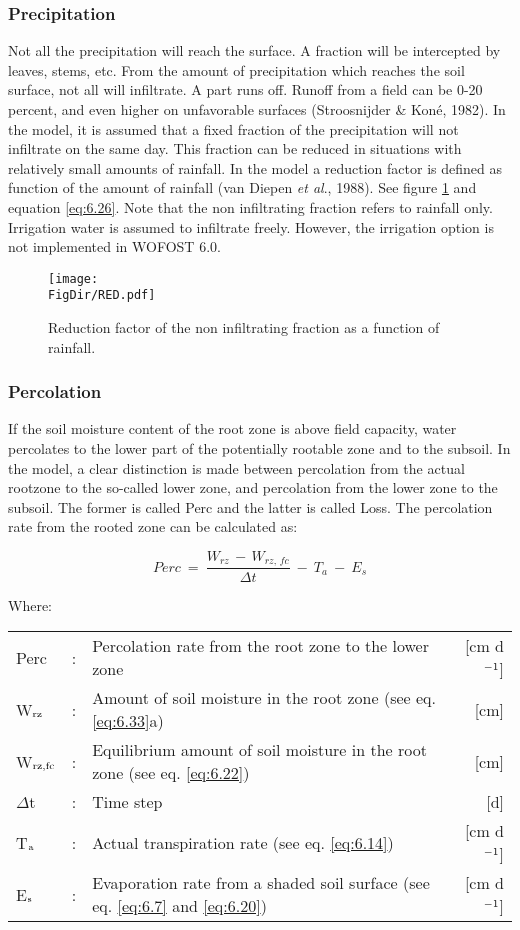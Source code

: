 \subsubsection{Precipitation}
Not all the precipitation will reach the surface. A fraction will be intercepted by leaves,
stems, etc. From the amount of precipitation which reaches the soil surface, not all will
infiltrate. A part runs off. Runoff from a field can be 0-20 percent, and even higher on
unfavorable surfaces (Stroosnijder \& Kon\'{e}, 1982). In the model, it is assumed that a
fixed fraction of the precipitation will not infiltrate on the same day. This fraction can be
reduced in situations with relatively small amounts of rainfall. In the model a reduction
factor is defined as function of the amount of rainfall (van Diepen {\it et al}., 1988). See 
figure \ref{fig:NonInfiltFrac} and equation \ref{eq:6.26}. Note that the non infiltrating 
fraction refers to rainfall only.
Irrigation water is assumed to infiltrate freely. However, the irrigation option is not
implemented in WOFOST 6.0.

\begin{figure}[p]
\centering
\texttt{[image: \\FigDir/RED.pdf]}
\caption{Reduction factor of the non infiltrating fraction as a function of rainfall.}
\label{fig:NonInfiltFrac}
\end{figure}
    
\subsubsection{Percolation}
If the soil moisture content of the root zone is above field capacity, water percolates to
the lower part of the potentially rootable zone and to the subsoil. In the model, a clear
distinction is made between percolation from the actual rootzone to the so-called lower
zone, and percolation from the lower zone to the subsoil. The former is called Perc and
the latter is called Loss. The percolation rate from the rooted zone can be calculated as:

\begin{equation}
\label{eq:6.21}
Perc  ~=~{\frac{W _{rz} \, -\, W _{rz,\, fc} }{\Delta t}} ~-~ T _{a} ~-~ E _{s} 
\end{equation}

Where:\\[5pt]
\begin{tabularx}{\textwidth}{llXr}
Perc &:& Percolation rate from the root zone to the lower zone  & [cm d$^{{\rm -1}}$]\\
W$_{{\rm rz}}$ &:& Amount of soil moisture in the root zone (see eq. \ref{eq:6.33}a)  & [cm]\\
W$_{{\rm rz,fc}}$ &:& Equilibrium amount of soil moisture in the root
   zone (see eq. \ref{eq:6.22})  & [cm]\\
$\Delta$t &:& Time step  & [d]\\
T$_{{\rm a}}$ &:& Actual transpiration rate (see eq. \ref{eq:6.14})  & [cm d$^{{\rm -1}}$]\\
E$_{{\rm s}}$ &:& Evaporation rate from a shaded soil surface 
  (see eq. \ref{eq:6.7}  and \ref{eq:6.20})  & [cm d$^{{\rm -1}}$]\\
\end{tabularx}

